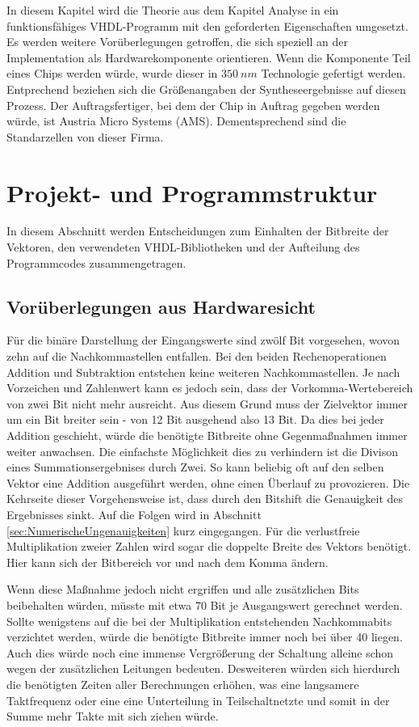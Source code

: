 

In diesem Kapitel wird die Theorie aus dem Kapitel Analyse in ein funktionsfähiges VHDL-Programm mit den geforderten Eigenschaften
umgesetzt.
Es werden weitere Vorüberlegungen getroffen, die sich speziell an der Implementation als Hardwarekomponente orientieren.
Wenn die Komponente Teil eines Chips werden würde, wurde dieser in $\SI{350}{nm}$ Technologie gefertigt werden. Entprechend beziehen
sich die Größenangaben der Syntheseergebnisse auf diesen Prozess. Der Auftragsfertiger, bei dem der Chip in Auftrag gegeben werden würde, ist
Austria Micro Systems (AMS). Dementsprechend sind die Standarzellen von dieser Firma.


\section{Projekt- und Programmstruktur}
In diesem Abschnitt werden Entscheidungen zum Einhalten der Bitbreite der Vektoren, den verwendeten VHDL-Bibliotheken und der Aufteilung des Programmcodes zusammengetragen.

 \subsection{Vorüberlegungen aus Hardwaresicht}
 Für die binäre Darstellung der Eingangswerte sind zwölf Bit vorgesehen, wovon zehn auf die 
 Nachkommastellen entfallen. Bei den beiden Rechenoperationen Addition und Subtraktion
 entstehen keine weiteren Nachkommastellen. Je nach Vorzeichen und Zahlenwert kann es jedoch sein,
 dass der Vorkomma-Wertebereich von zwei Bit nicht mehr ausreicht. Aus diesem Grund muss der Zielvektor
  immer um ein Bit breiter sein - von 12 Bit ausgehend also 13 Bit.
  Da dies bei jeder Addition geschieht, würde die benötigte Bitbreite ohne Gegenmaßnahmen immer 
  weiter anwachsen. Die einfachste Möglichkeit dies zu verhindern ist die Divison eines Summationsergebnises
  durch Zwei. 
  So kann beliebig oft auf den selben Vektor eine Addition ausgeführt werden, ohne einen Überlauf zu provozieren.
  Die Kehrseite dieser Vorgehensweise ist, dass durch den Bitshift die Genauigkeit des Ergebnisses sinkt.
  Auf die Folgen wird in Abschnitt \ref{sec:NumerischeUngenauigkeiten} kurz eingegangen.
  Für die verlustfreie Multiplikation zweier Zahlen wird sogar die doppelte Breite des Vektors 
  benötigt. Hier kann sich der Bitbereich vor und nach dem Komma ändern.
  
  Wenn diese Maßnahme jedoch nicht ergriffen und alle zusätzlichen Bits beibehalten 
  würden, müsste mit etwa 70 Bit je Ausgangswert gerechnet werden. Sollte wenigstens
  auf die bei der Multiplikation entstehenden Nachkommabits verzichtet werden, 
  würde die benötigte Bitbreite immer noch bei über 40 liegen.
  Auch dies würde noch eine immense Vergrößerung der Schaltung alleine schon wegen der zusätzlichen
  Leitungen bedeuten. Desweiteren würden sich hierdurch die benötigten Zeiten aller Berechnungen erhöhen, 
  was eine langsamere Taktfrequenz oder eine eine Unterteilung in Teilschaltnetzte und somit in der Summe
  mehr Takte mit sich ziehen würde.
  




